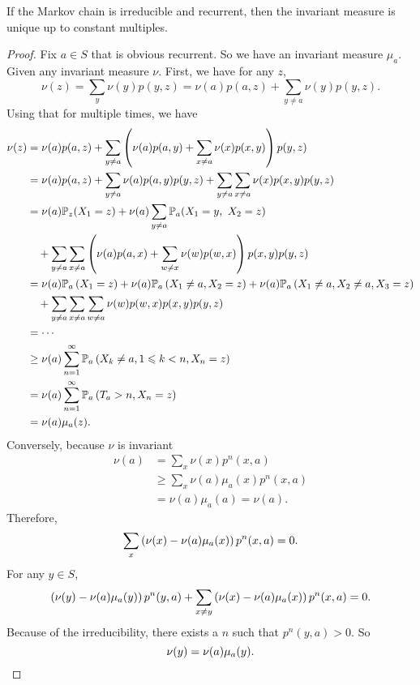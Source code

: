 \begin{thm}[Uniqueness]
    If the Markov chain is irreducible and recurrent, then the invariant measure is unique up to constant multiples.
\end{thm}
\begin{proof}
    Fix $a \in S$ that is obvious recurrent. So we have an invariant measure $\mu_a$. Given any invariant measure $\nu$. First, we have for any $z$,
    \begin{equation*}
        \nu(z) =\sum_y \nu(y)p(y,z) = \nu(a)p(a,z) + \sum_{y \neq a} \nu(y)p(y,z).
    \end{equation*}
    Using that for multiple times, we have
    \begin{align*}
        \nu(z) &= \nu(a)p(a,z) + \sum_{y \neq a} \left(\nu(a)p(a,y) + \sum_{x\neq a}\nu(x)p(x,y) \right)p(y,z)\\
        &=\nu(a)p(a,z) +  \sum_{y \neq a}\nu(a)p(a,y)p(y,z) + \sum_{y \neq a}\sum_{x\neq a}\nu(x)p(x,y)p(y,z) \\
        &= \nu(a)\mathbb{P}_z(X_1 = z) +  \nu(a)\sum_{y \neq a}\mathbb{P}_a(X_1 = y,~X_2=z) \\
        &\quad + \sum_{y \neq a}\sum_{x\neq a}\left( \nu(a)p(a,x) + \sum_{w \neq x} \nu(w)p(w,x) \right)p(x,y)p(y,z) \\
        &= \nu(a) \mathbb{P}_a\left(X_1=z\right)+\nu(a) \mathbb{P}_a\left(X_1 \neq a, X_2=z\right)+\nu(a) \mathbb{P}_a\left(X_1 \neq a, X_2 \neq a, X_3=z\right) \\
        &\quad + \sum_{y \neq a} \sum_{x \neq a} \sum_{w \neq a} \nu(w) p(w, x) p(x, y) p(y, z) \\
        &= \cdots \\
        &\geq \nu(a) \sum_{n=1}^{\infty} \mathbb{P}_a\left(X_k \neq a, 1 \leqslant k<n, X_n=z\right) \\
        &= \nu(a)\sum_{n=1}^{\infty} \mathbb{P}_a\left(T_a>n, X_n=z\right) \\
        &= \nu(a)\mu_a(z).
    \end{align*}
    Conversely, because $\nu$ is invariant
    \begin{equation*}
        \begin{aligned}
            \nu(a) &= \sum_x \nu(x)p^n(x,a) \\
            &\geq \sum_x \nu(a)\mu_a(x)p^n(x,a) \\
            &= \nu(a)\mu_a(a) = \nu(a).
        \end{aligned}
    \end{equation*}
    Therefore, 
    \begin{equation*}
        \sum_x \left(\nu(x) - \nu(a)\mu_a(x)\right)p^n(x,a) = 0.
    \end{equation*}
    For any $y \in S$, 
    \begin{equation*}
       \left(\nu(y) - \nu(a)\mu_a(y)\right)p^n(y,a) + \sum_{x\neq y} \left(\nu(x) - \nu(a)\mu_a(x)\right)p^n(x,a) = 0.
    \end{equation*}
    Because of the irreducibility, there exists a $n$ such that $p^n(y,a) > 0$. So
    \begin{equation*}
        \nu(y) = \nu(a)\mu_a(y). \qedhere
    \end{equation*}
\end{proof}

